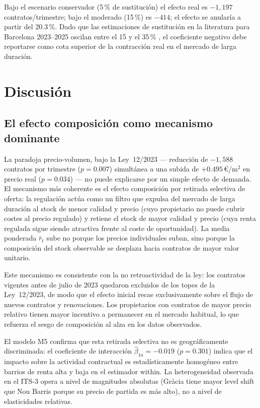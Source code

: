 \documentclass[10pt,a4paper,twocolumn]{article}
\begin{document}
Bajo el escenario conservador (5\,\% de sustitución) el efecto real es $-1{,}197$
contratos/trimestre; bajo el moderado (15\,\%) es $-414$; el efecto se anularía
a partir del 20.3\,\%. Dado que las estimaciones de sustitución en la literatura
para Barcelona 2023--2025 oscilan entre el 15 y el 35\,\% \citep{bosch2021ley11},
el coeficiente negativo debe reportarse como cota superior de la contracción real
en el mercado de larga duración.

\section{Discusión}
\label{sec:discusion}

\subsection{El efecto composición como mecanismo dominante}

La paradoja precio-volumen, bajo la Ley~12/2023 --- reducción de $-1{,}588$
contratos por trimestre ($p{=}0.007$) simultánea a una subida de $+0.495$\,\euro/m$^2$
en precio real ($p{=}0.034$) --- no puede explicarse por un simple efecto de demanda.
El mecanismo más coherente es el efecto composición por retirada selectiva de oferta:
la regulación actúa como un filtro que expulsa del mercado de larga duración al stock
de menor calidad y precio (cuyo propietario no puede cubrir costes al precio regulado)
y retiene el stock de mayor calidad y precio (cuya renta regulada sigue siendo
atractiva frente al coste de oportunidad). La media ponderada $\bar{r}_t$ sube no
porque los precios individuales suban, sino porque la composición del stock
observable se desplaza hacia contratos de mayor valor unitario.

Este mecanismo es consistente con la no retroactividad de la ley: los contratos
vigentes antes de julio de 2023 quedaron excluidos de los topes de la Ley~12/2023,
de modo que el efecto inicial recae exclusivamente sobre el flujo de nuevos
contratos y renovaciones. Los propietarios con contratos de mayor precio relativo
tienen mayor incentivo a permanecer en el mercado habitual, lo que refuerza el
sesgo de composición al alza en los datos observados.

El modelo M5 confirma que esta retirada selectiva no es geográficamente discriminada:
el coeficiente de interacción $\hat\beta_{1a}{=}{-}0.019$ ($p{=}0.301$) indica que
el impacto sobre la actividad contractual es estadísticamente homogéneo entre barrios
de renta alta y baja en el estimador within. La heterogeneidad observada en el ITS-3
opera a nivel de magnitudes absolutas (Gràcia tiene mayor level shift que Nou Barris
porque su precio de partida es más alto), no a nivel de elasticidades relativas.
\end{document}
